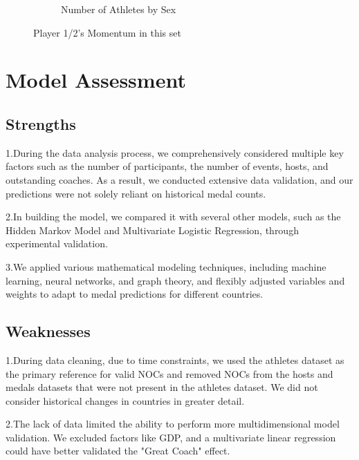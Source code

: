 \documentclass{mcmthesis}
\begin{document}
\begin{figure}[htbp]
\begin{subfigure}{0.45\textwidth}
        \caption{Number of Athletes by Sex}
        \label{subfig:player2}
    \end{subfigure}
    \caption{Player 1/2's Momentum in this set}
    \label{Figure6-7}
\end{figure}
\section{Model Assessment}
\subsection{Strengths}
1.During the data analysis process, we comprehensively considered multiple key factors such as the number of participants, the number of events, hosts, and outstanding coaches. As a result, we conducted extensive data validation, and our predictions were not solely reliant on historical medal counts.

2.In building the model, we compared it with several other models, such as the Hidden Markov Model and Multivariate Logistic Regression, through experimental validation.

3.We applied various mathematical modeling techniques, including machine learning, neural networks, and graph theory, and flexibly adjusted variables and weights to adapt to medal predictions for different countries.
\subsection{Weaknesses}
1.During data cleaning, due to time constraints, we used the athletes dataset as the primary reference for valid NOCs and removed NOCs from the hosts and medals datasets that were not present in the athletes dataset. We did not consider historical changes in countries in greater detail.

2.The lack of data limited the ability to perform more multidimensional model validation. We excluded factors like GDP, and a multivariate linear regression could have better validated the "Great Coach" effect.
\end{document}
